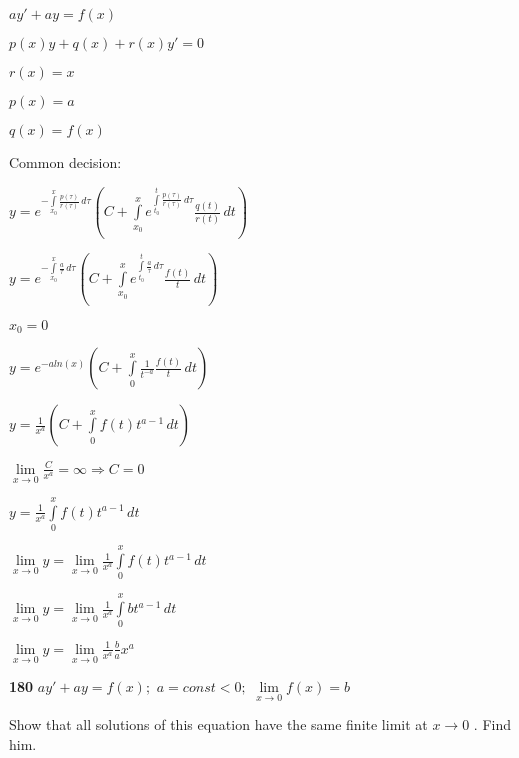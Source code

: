 \documentclass{article}
\begin{document}
\begin{center}
\begin{spacing}{1.5}
$ay'+ay=f(x)$

$p(x)y+q(x)+r(x)y'=0$

$r(x)=x$

$p(x)=a$

$q(x)=f(x)$

\end{spacing}
\end{center}
Common decision:
\begin{center}
\begin{spacing}{1.8}
$\displaystyle y= e^{-\int\limits _{x_0}^x \frac{p(\tau)}{r(\tau)}\,d\tau} (C+\int\limits _{x_0}^x e^{\int\limits _{t_0}^t\frac{p(\tau)}{r(\tau)}\,d\tau}\frac{q(t)}{r(t)}\,dt)$

$\displaystyle y= e^{-\int\limits _{x_0}^x \frac{a}{\tau}\,d\tau} (C+\int\limits _{x_0}^x e^{\int\limits _{t_0}^t\frac{a}{\tau}\,d\tau}\frac{f(t)}{t}\,dt)$
\end{spacing}
\end{center}
$x_0=0$
\begin{center}
\begin{spacing}{3}
$\displaystyle y= e^{-aln(x)} (C+\int\limits _0^x \frac{1}{t^{-a}}\frac{f(t)}{t}\,dt)$

$\displaystyle y= \frac{1}{x^a} (C+\int\limits _0^x f(t)t^{a-1}\,dt)$

$\displaystyle \lim\limits_{x \to 0} \frac{C}{x^a} = \infty \Rightarrow C=0$

$\displaystyle y= \frac{1}{x^a}\int\limits _0^x f(t)t^{a-1}\,dt$

$\displaystyle \lim\limits_{x \to 0}y= \lim\limits_{x \to 0}\frac{1}{x^a}\int\limits _0^x f(t)t^{a-1}\,dt$

$\displaystyle \lim\limits_{x \to 0}y= \lim\limits_{x \to 0}\frac{1}{x^a}\int\limits _0^x bt^{a-1}\,dt$

$\displaystyle \lim\limits_{x \to 0}y= \lim\limits_{x \to 0}\frac{1}{x^a}\frac{b}{a}x^a$

\end{spacing}
\end{center}
\begin{flushleft}
{\bf 180 } $ay'+ay=f(x); $ $a=const<0; $ $\lim\limits_{x \to 0} f(x) = b$

\end{flushleft}
Show that all solutions of this equation have the same finite limit at $x \rightarrow 0$ . Find him.
\end{document}
